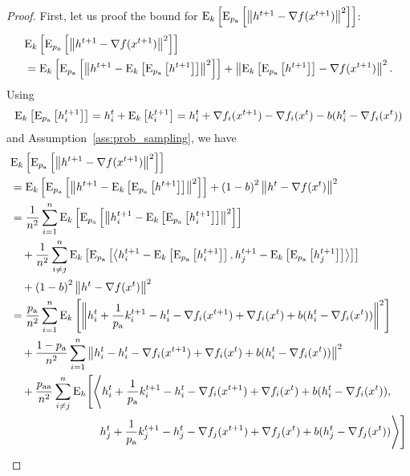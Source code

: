 \documentclass{article}
\begin{document}
\begin{proof}
  First, let us proof the bound for ${\rm E}_{k}\left[{\rm E}_{p_{\textnormal{a}}}\left[\left\| h^{t+1} - \nabla f(x^{t+1}) \right\|^2\right]\right]$:
  \begin{align*}
      &{\rm E}_{k}\left[{\rm E}_{p_{\textnormal{a}}}\left[\left\| h^{t+1} - \nabla f(x^{t+1}) \right\|^2\right]\right] \\
      &={\rm E}_{k}\left[{\rm E}_{p_{\textnormal{a}}}\left[\left\| h^{t+1} - {\rm E}_{k}\left[{\rm E}_{p_{\textnormal{a}}}\left[h^{t+1}\right]\right] \right\|^2\right]\right] + \left\| {\rm E}_{k}\left[{\rm E}_{p_{\textnormal{a}}}\left[h^{t+1}\right]\right] - \nabla f(x^{t+1}) \right\|^2.
  \end{align*}
  Using
  \begin{align*}
      {\rm E}_{k}\left[{\rm E}_{p_{\textnormal{a}}}\left[h^{t+1}_i\right]\right] = h^{t}_i + {\rm E}_{k}\left[k^{t+1}_i\right] = h^{t}_i + \nabla f_i(x^{t+1}) - \nabla f_i(x^{t}) - b(h^t_i - \nabla f_i(x^{t}))
  \end{align*}
  and Assumption~\ref{ass:prob_sampling}, we have
  \begin{align*}
      &\ExpSub{k}{\ExpSub{\probavailable}{\norm{h^{t+1} - \nabla f(x^{t+1})}^2}} \\
      &=\ExpSub{k}{\ExpSub{\probavailable}{\norm{h^{t+1} - \ExpSub{k}{\ExpSub{\probavailable}{h^{t+1}}}}^2}} + \left(1 - b\right)^2 \norm{h^{t} - \nabla f(x^{t})}^2\\
      &=\frac{1}{n^2}\sum_{i=1}^n \ExpSub{k}{\ExpSub{\probavailable}{\norm{h^{t+1}_i - \ExpSub{k}{\ExpSub{\probavailable}{h^{t+1}_i}}}^2}} \\
      &\quad+ \frac{1}{n^2}\sum_{i\neq j}^n \ExpSub{k}{\ExpSub{\probavailable}{\inp{h^{t+1}_i - \ExpSub{k}{\ExpSub{\probavailable}{h^{t+1}_i}}}{h^{t+1}_j - \ExpSub{k}{\ExpSub{\probavailable}{h^{t+1}_j}}}}} \\
      &\quad + \left(1 - b\right)^2 \norm{h^{t} - \nabla f(x^{t})}^2 \\
      &=\frac{\probavailable}{n^2}\sum_{i=1}^n \ExpSub{k}{\norm{h^{t}_i + \frac{1}{\probavailable}k^{t+1}_i - h^{t}_i - \nabla f_i(x^{t+1}) + \nabla f_i(x^{t}) + b(h^t_i - \nabla f_i(x^{t}))}^2} \\
      &\quad + \frac{1 - \probavailable}{n^2}\sum_{i=1}^n \norm{h^{t}_i - h^{t}_i - \nabla f_i(x^{t+1}) + \nabla f_i(x^{t}) + b(h^t_i - \nabla f_i(x^{t}))}^2 \\
      &\quad +\frac{\probpairaa}{n^2}\sum_{i \neq j}^n{\rm E}_{h}\Bigg[\Bigg\langle h^{t}_i + \frac{1}{\probavailable}k^{t+1}_i - h^{t}_i - \nabla f_i(x^{t+1}) + \nabla f_i(x^{t}) + b(h^t_i - \nabla f_i(x^{t})), \\
      &\qquad\qquad\qquad\qquad h^{t}_j + \frac{1}{\probavailable}k^{t+1}_j - h^{t}_j - \nabla f_j(x^{t+1}) + \nabla f_j(x^{t}) + b(h^t_j - \nabla f_j(x^{t}))\Bigg\rangle\Bigg] \\

\end{align*}
\end{proof}
\end{document}
